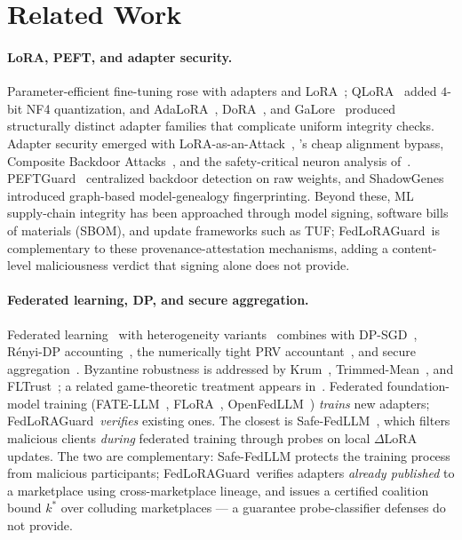 \documentclass[11pt]{article}
\theoremstyle{plain}
\theoremstyle{definition}
\theoremstyle{remark}
\newcommand{\modelname}{FedLoRAGuard}
\begin{document}
\section{Related Work}
\label{sec:related}

\paragraph{LoRA, PEFT, and adapter security.}
Parameter-efficient fine-tuning rose with adapters and
LoRA~\cite{hu2021lora}; QLoRA~\cite{dettmers2023qlora} added
$4$-bit NF4 quantization, and AdaLoRA~\cite{zhang2023adalora},
DoRA~\cite{liu2024dora}, and GaLore~\cite{zhao2024galore} produced
structurally distinct adapter families that complicate uniform
integrity checks. Adapter security emerged with
LoRA-as-an-Attack~\cite{liu2024loraattack},
\citet{lermen2023lora}'s cheap alignment bypass, Composite
Backdoor Attacks~\cite{huang2024composite}, and the
safety-critical neuron analysis of~\citet{wei2024brittleness}.
PEFTGuard~\cite{sun2025peftguard} centralized backdoor detection
on raw weights, and ShadowGenes~\cite{schulz2025shadowgenes}
introduced graph-based model-genealogy fingerprinting. Beyond
these, ML supply-chain integrity has been approached through
model signing, software bills of materials (SBOM), and update
frameworks such as TUF; \modelname\ is complementary to these
provenance-attestation mechanisms, adding a content-level
maliciousness verdict that signing alone does not provide.

\paragraph{Federated learning, DP, and secure aggregation.}
Federated learning~\cite{mcmahan2017fedavg} with heterogeneity
variants~\cite{li2020fedprox,karimireddy2020scaffold} combines
with DP-SGD~\cite{abadi2016deep}, R\'enyi-DP
accounting~\cite{mironov2017renyi}, the numerically tight PRV
accountant~\cite{gopi2021numerical}, and secure
aggregation~\cite{bonawitz2017practical}. Byzantine robustness is
addressed by Krum~\cite{blanchard2017machine},
Trimmed-Mean~\cite{yin2018byzantine}, and
FLTrust~\cite{cao2021fltrust}; a related game-theoretic treatment
appears in~\cite{anaedevha2026byzantine}. Federated
foundation-model training (FATE-LLM~\cite{fan2023fatellm},
FLoRA~\cite{wang2024flora},
OpenFedLLM~\cite{ye2024openfedllm}) \emph{trains} new adapters;
\modelname\ \emph{verifies} existing ones. The closest is
Safe-FedLLM~\cite{tao2026safefedllm}, which filters malicious
clients \emph{during} federated training through probes on local
$\Delta$LoRA updates. The two are complementary: Safe-FedLLM
protects the training process from malicious participants;
\modelname\ verifies adapters \emph{already published} to a
marketplace using cross-marketplace lineage, and issues a certified
coalition bound $k^*$ over colluding marketplaces --- a guarantee
probe-classifier defenses do not provide.
\end{document}
